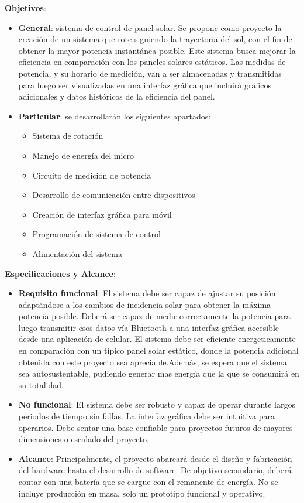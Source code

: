 \documentclass[a4paper,12pt]{article}
\begin{document}
\textbf{Objetivos}: 
\begin{itemize}
    \item \textbf{General}: sistema de control de panel solar. Se propone como proyecto la creación de un sistema que rote siguiendo la trayectoria del sol, con el fin de obtener la mayor potencia instantánea posible. Este sistema busca mejorar la eficiencia en comparación con los paneles solares estáticos. Las medidas de potencia, y su horario de medición, van a ser almacenadas y transmitidas para luego ser visualizadas en una interfaz gráfica que incluirá gráficos adicionales y datos históricos de la eficiencia del panel.
    \item \textbf{Particular}: se desarrollarán los siguientes apartados:
    \begin{itemize}
        \item Sistema de rotación
        \item Manejo de energía del micro
        \item Circuito de medición de potencia
        \item Desarrollo de comunicación entre dispositivos
        \item Creación de interfaz gráfica para móvil
        \item Programación de sistema de control
        \item Alimentación del sistema
        
    \end{itemize}

    
\end{itemize}

\textbf{Especificaciones y Alcance}:
\begin{itemize}
    \item \textbf{Requisito funcional}: El sistema debe ser capaz de ajustar su posición adaptándose a los cambios de incidencia solar para obtener la máxima potencia posible. Deberá ser capaz de medir correctamente la potencia para luego transmitir esos datos vía Bluetooth a una interfaz gráfica accesible desde una aplicación de celular. El sistema debe ser eficiente energeticamente en comparación con un típico panel solar estático, donde la potencia adicional obtenida con este proyecto sea apreciable.Además, se espera que el sistema sea autosustentable, pudiendo generar mas energía que la que se consumirá en su totalidad.
    \item \textbf{No funcional}: El sistema debe ser robusto y capaz de operar durante largos periodos de tiempo sin fallas. La interfaz gráfica debe ser intuitiva para operarios. Debe sentar una base confiable para proyectos futuros de mayores dimensiones o escalado del proyecto.
    \item \textbf{Alcance}: Principalmente, el proyecto abarcará desde el diseño y fabricación del hardware hasta el desarrollo de software. De objetivo secundario, deberá contar con una batería que se cargue con el remanente de energía. No se incluye producción en masa, solo un prototipo funcional y operativo.
\end{itemize}
\end{document}
